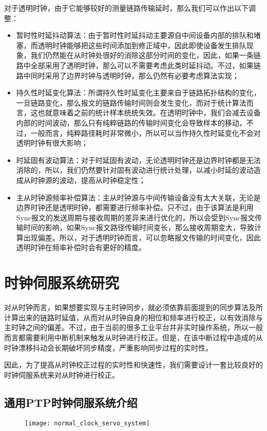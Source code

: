对于透明时钟，由于它能够较好的测量链路传输延时，那么我们可以作出以下调整：
\begin{itemize}[noitemsep,topsep=0pt,parsep=0pt,partopsep=0pt]
  \item 暂时性时延抖动算法：由于暂时性时延抖动主要源自中间设备内部的排队和堵塞，而透明时钟能够把这些时间添加到修正域中，因此即使设备发生排队现象，我们仍然能在从时钟处很好的消除这部分时间的变化，因此，如果一条链路中全部采用了透明时钟，那么可以不需要考虑此类时延抖动。不过，如果链路中同时采用了边界时钟与透明时钟，那么仍然有必要考虑算法实现；
  \item 持久性时延变化算法：所谓持久性时延变化主要来自于链路拓扑结构的变化，一旦链路变化，那么报文的链路传输时间则会发生变化，而对于统计算法而言，这也就意味着之前的统计样本统统失效。在透明时钟中，我们会减去设备内部的时间波动，那么只有纯粹链路的传输时间变化会导致样本的移动，不过，一般而言，纯粹路径耗时非常微小，所以可以当作持久性时延变化不会对透明时钟有很大影响；
  \item 时延固有波动算法：对于时延固有波动，无论透明时钟还是边界时钟都是无法消除的，所以，我们仍然要针对固有波动进行统计处理，以减小时延的波动造成从时钟源的波动，提高从时钟稳定性；
  \item 主从时钟源频率补偿算法：主从时钟源与中间传输设备没有太大关联，无论是边界时钟还是透明时钟，都需要进行频率补偿。只不过，由于该算法是利用Sync报文的发送周期与接收周期的差异来进行优化的，所以会受到Sync报文传输时间的影响，如果Sync报文路径传输时间变长，那么接收周期变大，导致计算出现偏差。所以，对于透明时钟而言，可以忽略报文传输的时间变化，因此透明时钟在频率补偿时会有更好的精度。
\end{itemize}

\section{时钟伺服系统研究}
对从时钟而言，如果想要实现与主时钟同步，就必须依靠前面提到的同步算法及所计算出来的链路时延值，从而对从时钟自身的相位和频率进行校正，以有效消除与主时钟之间的偏差。不过，由于当前的很多工业平台并非实时操作系统，所以一般而言都需要利用中断机制来触发从时钟进行校正。但是，在该中断过程中造成的从时钟漂移抖动会长期破坏同步精度，严重影响同步过程的实时性。

因此，为了提高从时钟校正过程的实时性和快速性，我们需要设计一套比较良好的时钟伺服系统来对从时钟进行校正。

\subsection{通用PTP时钟伺服系统介绍}
\begin{figure}[!hbp]
  \centering
  \begin{minipage}[b]{0.7\textwidth}
    \captionstyle{\centering}
    \centering
    \texttt{[image: normal\_clock\_servo\_system]}
  \end{minipage}     
\end{figure}

